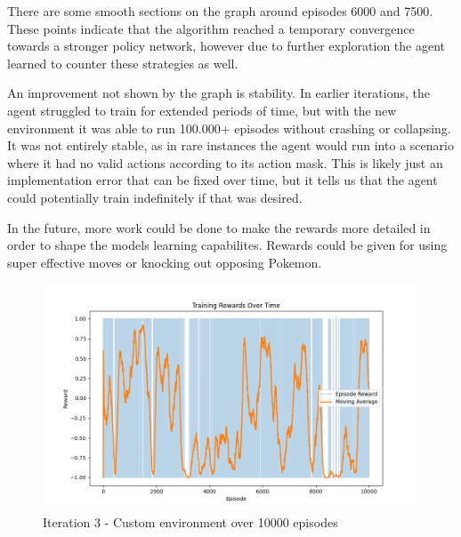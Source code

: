 There are some smooth sections on the graph around episodes 6000 and 7500. These points indicate that the algorithm reached a temporary convergence towards
a stronger policy network, however due to further exploration the agent learned to counter these strategies as well.

An improvement not shown by the graph is stability. In earlier iterations, the agent struggled to train for extended periods of time, but with the new environment
it was able to run 100.000+ episodes without crashing or collapsing. It was not entirely stable, as in rare instances the agent would run into a scenario where it
had no valid actions according to its action mask. This is likely just an implementation error that can be fixed over time, but it tells us that the agent could
potentially train indefinitely if that was desired. 

In the future, more work could be done to make the rewards more detailed in order to shape the models learning capabilites. Rewards could be given for using
super effective moves or knocking out opposing Pokemon.

\begin{figure}[H]
    \centering
    \includegraphics[width=\textwidth]{assets/iteration-3-10k-rewards.png}
    \caption{Iteration 3 - Custom environment over 10000 episodes}
    \label{fig:iteration-3-graph}
\end{figure}

